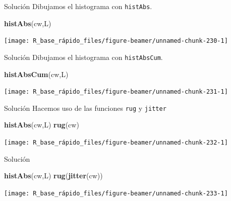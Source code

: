 \documentclass[
  ignorenonframetext,
  aspectratio=169]{beamer}
\newenvironment{Shaded}{\begin{snugshade}}{\end{snugshade}}
\newcommand{\FunctionTok}[1]{\textcolor[rgb]{0.13,0.29,0.53}{\textbf{#1}}}
\newcommand{\NormalTok}[1]{#1}
\begin{document}
\begin{frame}[fragile]{Solución}
\label{soluciuxf3n-40}
Dibujamos el histograma con \texttt{histAbs}.

\begin{Shaded}
\begin{Highlighting}[]
\FunctionTok{histAbs}\NormalTok{(cw,L)}
\end{Highlighting}
\end{Shaded}

\begin{center}\texttt{[image: R\_base\_rápido\_files/figure-beamer/unnamed-chunk-230-1]} \end{center}
\end{frame}

\begin{frame}[fragile]{Solución}
\label{soluciuxf3n-41}
Dibujamos el histograma con \texttt{histAbsCum}.

\begin{Shaded}
\begin{Highlighting}[]
\FunctionTok{histAbsCum}\NormalTok{(cw,L)}
\end{Highlighting}
\end{Shaded}

\begin{center}\texttt{[image: R\_base\_rápido\_files/figure-beamer/unnamed-chunk-231-1]} \end{center}
\end{frame}

\begin{frame}[fragile]{Solución}
\label{soluciuxf3n-42}
Hacemos uso de las funciones \texttt{rug} y \texttt{jitter}

\begin{Shaded}
\begin{Highlighting}[]
\FunctionTok{histAbs}\NormalTok{(cw,L)}
\FunctionTok{rug}\NormalTok{(cw)}
\end{Highlighting}
\end{Shaded}

\begin{center}\texttt{[image: R\_base\_rápido\_files/figure-beamer/unnamed-chunk-232-1]} \end{center}
\end{frame}

\begin{frame}[fragile]{Solución}
\label{soluciuxf3n-43}
\begin{Shaded}
\begin{Highlighting}[]
\FunctionTok{histAbs}\NormalTok{(cw,L)}
\FunctionTok{rug}\NormalTok{(}\FunctionTok{jitter}\NormalTok{(cw))}
\end{Highlighting}
\end{Shaded}

\begin{center}\texttt{[image: R\_base\_rápido\_files/figure-beamer/unnamed-chunk-233-1]} \end{center}
\end{frame}
\end{document}
